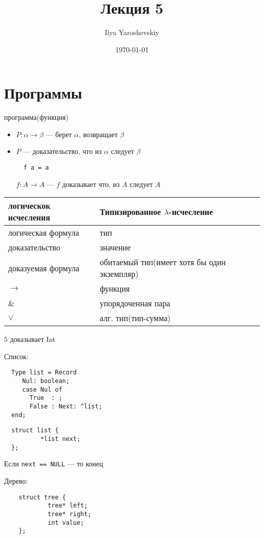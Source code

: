 \documentclass[english]{article}
\author{Ilya Yaroshevskiy}
\date{\today}
\title{Лекция 5}
\begin{document}
\maketitle
\tableofcontents


\section{Программы}
\label{sec:org2385505}
программа(функция)
\begin{itemize}
	\item \(P: \alpha \to \beta\) --- берет \(\alpha\), возвращает \(\beta\)
	\item \(P\) --- доказательство, что из \(\alpha\) следует \(\beta\)
	      \begin{examp}
		      \-
		      \begin{verbatim}
  f a = a
\end{verbatim}
		      \(f: A \to A\) --- \(f\) доказывает что, из \(A\) следует \(A\)
	      \end{examp}
\end{itemize}

\begin{center}
	\begin{tabular}{ll}
		логическок исчесления & Типизированное \(\lambda\)-исчесление       \\
		\hline
		логическая формула    & тип                                         \\
		доказательство        & значение                                    \\
		доказуемая формула    & обитаемый тип(имеет хотя бы один экземпляр) \\
		\(\to\)               & функция                                     \\
		\&                    & упорядоченная пара                          \\
		\(\vee\)              & алг. тип(тип-сумма)                         \\
	\end{tabular}
\end{center}
\begin{examp}
	\(5\) доказывает Int
\end{examp}
\begin{examp}
	Список:
	\begin{verbatim}
  Type list = Record
     Nul: boolean;
     case Nul of
       True  : ;
       False : Next: ^list;
  end;
\end{verbatim}
	\begin{verbatim}
  struct list {
          *list next;
  };
\end{verbatim}
	Если \texttt{next == NULL} --- то конец
\end{examp}
\begin{examp}
	Дерево:
	\begin{verbatim}
    struct tree {
            tree* left;
            tree* right;
            int value;
    };
\end{verbatim}
\end{examp}
\end{document}
